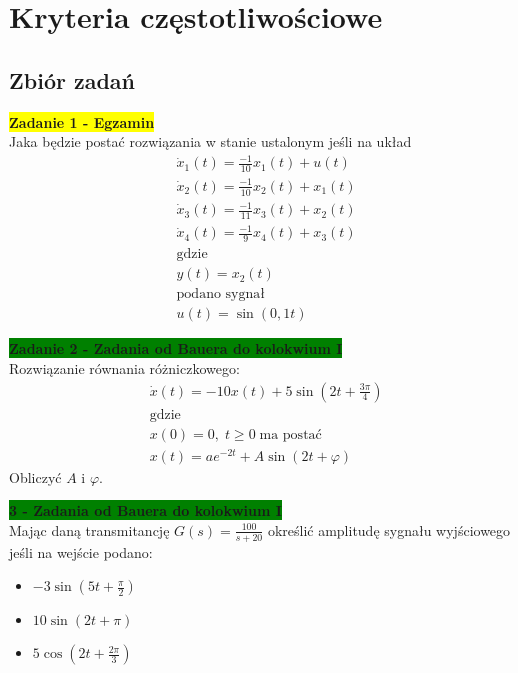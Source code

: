 \documentclass[a4paper,11pt]{article}
\begin{document}
\newpage
\section{Kryteria częstotliwościowe}
\subsection{Zbiór zadań}
\begin{framed}
\textbf{\colorbox{yellow}{Zadanie 1 - Egzamin }} \\ 
Jaka będzie postać rozwiązania w stanie ustalonym jeśli na układ  
\begin{align*}
&\dot{x}_{1}(t)=\frac{-1}{10}x_{1}(t)+u(t) \\
&\dot{x}_{2}(t)=\frac{-1}{10}x_{2}(t)+x_{1}(t) \\
&\dot{x}_{3}(t)=\frac{-1}{11}x_{3}(t)+x_{2}(t) \\
&\dot{x}_{4}(t)=\frac{-1}{9}x_{4}(t)+x_{3}(t) \\
&\text{gdzie}\\
&y(t) = x_{2}(t)\\
&\text{podano sygnał} \\
& u(t)=\sin (0,1t)
\end{align*}
\end{framed}


\begin{framed}
\textbf{\colorbox{green}{Zadanie 2 - Zadania od Bauera do kolokwium I} } \\ 
Rozwiązanie równania różniczkowego: 
\begin{align*}
&\dot{x}(t)=-10x(t)+5\sin (2t+\frac{3\pi}{4}) \\
&\text{gdzie} \\
&x(0)=0, \; t \geq 0 \; \text{ma postać} \\
&x(t)=ae^{-2t}+A\sin (2t+\varphi)
\end{align*}
Obliczyć \( A \) i \( \varphi \).
\end{framed}

\begin{framed}
\textbf{\colorbox{green}{ 3 - Zadania od Bauera do kolokwium I }} \\ 
Mając daną transmitancję \( G(s) = \frac{100}{s+20} \) określić amplitudę sygnału wyjściowego jeśli na wejście podano:

\begin{itemize}
\item \( -3 \sin (5t+\frac{\pi}{2}) \)
\item \( 10 \sin (2t+\pi) \)
\item \( 5 \cos (2t+\frac{2\pi}{3}) \)
\end{itemize}
\end{framed}
\end{document}
